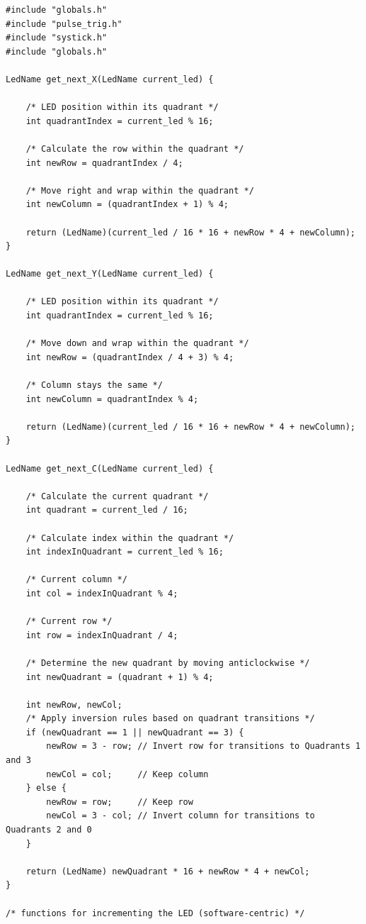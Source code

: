 \documentclass[12pt]{article}
\numberwithin{subsubsubsection}{subsubsection}
\begin{document}
\begin{verbatim}
#include "globals.h"
#include "pulse_trig.h"
#include "systick.h"
#include "globals.h"

LedName get_next_X(LedName current_led) {

    /* LED position within its quadrant */
    int quadrantIndex = current_led % 16;
    
    /* Calculate the row within the quadrant */
    int newRow = quadrantIndex / 4;
    
    /* Move right and wrap within the quadrant */
    int newColumn = (quadrantIndex + 1) % 4;
    
    return (LedName)(current_led / 16 * 16 + newRow * 4 + newColumn);
}

LedName get_next_Y(LedName current_led) {

    /* LED position within its quadrant */
    int quadrantIndex = current_led % 16;
    
    /* Move down and wrap within the quadrant */
    int newRow = (quadrantIndex / 4 + 3) % 4;
    
    /* Column stays the same */
    int newColumn = quadrantIndex % 4;
    
    return (LedName)(current_led / 16 * 16 + newRow * 4 + newColumn);
}

LedName get_next_C(LedName current_led) {

    /* Calculate the current quadrant */
    int quadrant = current_led / 16;
    
    /* Calculate index within the quadrant */
    int indexInQuadrant = current_led % 16;
    
    /* Current column */
    int col = indexInQuadrant % 4;
    
    /* Current row */
    int row = indexInQuadrant / 4;
    
    /* Determine the new quadrant by moving anticlockwise */
    int newQuadrant = (quadrant + 1) % 4;
    
    int newRow, newCol;
    /* Apply inversion rules based on quadrant transitions */
    if (newQuadrant == 1 || newQuadrant == 3) {
        newRow = 3 - row; // Invert row for transitions to Quadrants 1 and 3
        newCol = col;     // Keep column
    } else {
        newRow = row;     // Keep row
        newCol = 3 - col; // Invert column for transitions to Quadrants 2 and 0
    }
    
    return (LedName) newQuadrant * 16 + newRow * 4 + newCol;
}

/* functions for incrementing the LED (software-centric) */


\end{verbatim}
\end{document}
